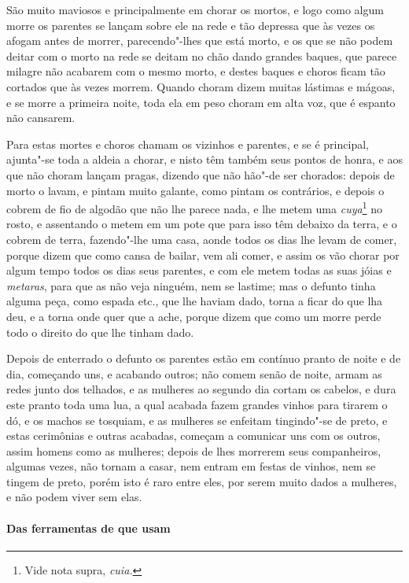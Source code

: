  São muito maviosos e principalmente em chorar os mortos, e logo como
algum morre os parentes se lançam sobre ele na rede e tão depressa que
às vezes os afogam antes de morrer, parecendo"-lhes que está morto, e os
que se não podem deitar com o morto na rede se deitam no chão dando
grandes baques, que parece milagre não acabarem com o mesmo morto, e
destes baques e choros ficam tão cortados que às vezes morrem. Quando
choram dizem muitas lástimas e mágoas, e se morre a primeira noite,
toda ela em peso choram em alta voz, que é espanto não cansarem.

 Para estas mortes e choros chamam os vizinhos e parentes, e se é
principal, ajunta"-se toda a aldeia a chorar, e nisto têm também seus
pontos de honra, e aos que não choram lançam pragas, dizendo que não
hão"-de ser chorados: depois de morto o lavam, e pintam muito galante,
como pintam os contrários, e depois o cobrem de fio de algodão que não
lhe parece nada, e lhe metem uma \textit{cuya}\footnote{ Vide nota
supra, \textit{cuia.}} no rosto, e assentando o metem em um
pote que para isso têm debaixo da terra, e o cobrem de terra,
fazendo"-lhe uma casa, aonde todos os dias lhe levam de comer, porque
dizem que como cansa de bailar, vem ali comer, e assim os vão chorar
por algum tempo todos os dias seus parentes, e com ele metem todas as
suas jóias e \textit{metaras}, para que as não veja ninguém, nem se
lastime; mas o defunto tinha alguma peça, como espada etc., que lhe
haviam dado, torna a ficar do que lha deu, e a torna onde quer que a
ache, porque dizem que como um morre perde todo o direito do que lhe tinham dado.

 Depois de enterrado o defunto os parentes estão em contínuo pranto de
noite e de dia, começando uns, e acabando outros; não comem senão de
noite, armam as redes junto dos telhados, e as mulheres ao segundo dia
cortam os cabelos, e dura este pranto toda uma lua, a qual acabada
fazem grandes vinhos para tirarem o dó, e os machos se tosquiam, e as
mulheres se enfeitam tingindo"-se de preto, e estas cerimônias e outras
acabadas, começam a comunicar uns com os outros, assim homens como as
mulheres; depois de lhes morrerem seus companheiros, algumas vezes, não
tornam a casar, nem entram em festas de vinhos, nem se tingem de preto,
porém isto é raro entre eles, por serem muito dados a mulheres, e não
podem viver sem elas.

\paragraph{Das ferramentas de que usam}


